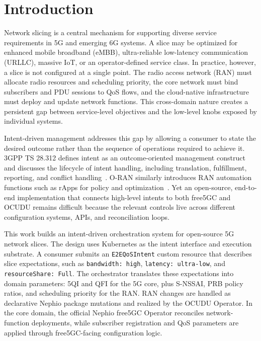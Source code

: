 ﻿\section{Introduction}
\label{sec:introduction}

Network slicing is a central mechanism for supporting diverse service requirements in 5G and emerging 6G systems. A slice may be optimized for enhanced mobile broadband (eMBB), ultra-reliable low-latency communication (URLLC), massive IoT, or an operator-defined service class. In practice, however, a slice is not configured at a single point. The radio access network (RAN) must allocate radio resources and scheduling priority, the core network must bind subscribers and PDU sessions to QoS flows, and the cloud-native infrastructure must deploy and update network functions. This cross-domain nature creates a persistent gap between service-level objectives and the low-level knobs exposed by individual systems.

Intent-driven management addresses this gap by allowing a consumer to state the desired outcome rather than the sequence of operations required to achieve it. 3GPP TS 28.312 defines intent as an outcome-oriented management construct and discusses the lifecycle of intent handling, including translation, fulfillment, reporting, and conflict handling~\cite{3gpp_ts28312}. O-RAN similarly introduces RAN automation functions such as rApps for policy and optimization~\cite{oran_oad_r005}. Yet an open-source, end-to-end implementation that connects high-level intents to both free5GC and OCUDU remains difficult because the relevant controls live across different configuration systems, APIs, and reconciliation loops.

This work builds an intent-driven orchestration system for open-source 5G network slices. The design uses Kubernetes as the intent interface and execution substrate. A consumer submits an \texttt{E2EQoSIntent} custom resource that describes slice expectations, such as \texttt{bandwidth: high}, \texttt{latency: ultra-low}, and \texttt{resourceShare: Full}. The orchestrator translates these expectations into domain parameters: 5QI and QFI for the 5G core, plus S-NSSAI, PRB policy ratios, and scheduling priority for the RAN. RAN changes are handled as declarative Nephio package mutations and realized by the OCUDU Operator. In the core domain, the official Nephio free5GC Operator reconciles network-function deployments, while subscriber registration and QoS parameters are applied through free5GC-facing configuration logic.

